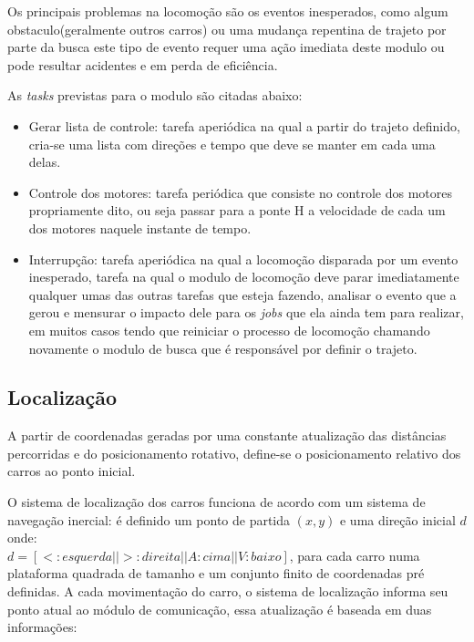 \documentclass{abnt}
\begin{document}
         Os principais problemas na locomoção são os eventos inesperados, como
         algum obstaculo(geralmente outros carros) ou uma mudança repentina de trajeto por
         parte da busca este tipo de evento requer uma ação imediata deste
         modulo ou pode resultar acidentes e em perda de eficiência.

         As \textit{tasks} previstas para o modulo são citadas abaixo:
         
         \begin{itemize}
            \item Gerar lista de controle: tarefa aperiódica na qual a partir do
                trajeto definido, cria-se uma lista com direções e tempo que deve 
                se manter em cada uma  delas.
            \item Controle dos motores: tarefa periódica que consiste no controle dos motores propriamente
                dito, ou seja passar para a ponte H a velocidade de cada um dos motores
                naquele instante de tempo.

            \item Interrupção: tarefa aperiódica na qual a locomoção disparada
                por um evento inesperado, tarefa na qual o modulo de locomoção
                deve parar imediatamente qualquer umas das outras tarefas que
                esteja fazendo, analisar o evento que a gerou  e mensurar  o
                impacto dele para os \textit{jobs} que ela ainda tem para realizar, em
                muitos casos tendo que reiniciar o processo de locomoção
                chamando novamente o modulo de busca que é responsável por
                definir o trajeto.
         \end{itemize}

        \subsection{Localização} 
        
        A partir de coordenadas geradas por uma constante atualização das
        distâncias percorridas e do posicionamento rotativo, define-se o
        posicionamento relativo dos carros ao ponto inicial.

        O sistema de localização dos carros funciona de acordo com um sistema
        de navegação inercial: é definido um ponto de partida $(x,y)$ e uma
        direção inicial $d$ onde:\\
        $d = { [< : esquerda ||  > : direita || A: cima || V: baixo]}$, 
        para cada carro numa plataforma quadrada de tamanho e um
        conjunto finito de coordenadas pré definidas. A cada movimentação do
        carro, o sistema de localização informa seu ponto atual ao módulo de
        comunicação, essa atualização é baseada em duas informações: 
\end{document}
